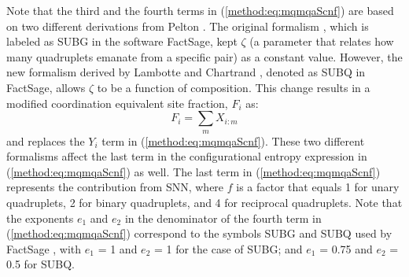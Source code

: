 Note that the third and the fourth terms in (\ref{method:eq:mqmqaScnf}) are based on two different derivations from Pelton \cite{pelton2018phase}. The original formalism \cite{pelton2001modified}, which is labeled as SUBG in the software FactSage, kept $\zeta$ (a parameter that relates how many quadruplets emanate from a specific pair) as a constant value. However, the new formalism derived by Lambotte and Chartrand \cite{lambotte2011thermodynamic}, denoted as SUBQ in FactSage, allows $\zeta$ to be a function of composition. This change results in a modified coordination equivalent site fraction, $F_i$ as:
\begin{equation} \label{method:eq:mqmqaFi}
    F_i=\sum_{m} X_{i:m}
\end{equation}
and replaces the $Y_i$ term in (\ref{method:eq:mqmqaScnf}). These two different formalisms affect the last term in the configurational entropy expression in (\ref{method:eq:mqmqaScnf}) as well. The last term in (\ref{method:eq:mqmqaScnf}) represents the contribution from SNN, where $f$ is a factor that equals 1 for unary quadruplets, 2 for binary quadruplets, and 4 for reciprocal quadruplets. Note that the exponents $e_1$ and $e_2$ in the denominator of the fourth term in (\ref{method:eq:mqmqaScnf}) correspond to the symbols SUBG and SUBQ used by FactSage \cite{bale2002factsage}, with $e_1$ = 1 and $e_2$ = 1 for the case of SUBG; and $e_1$ = 0.75 and $e_2$ = 0.5 for SUBQ.

